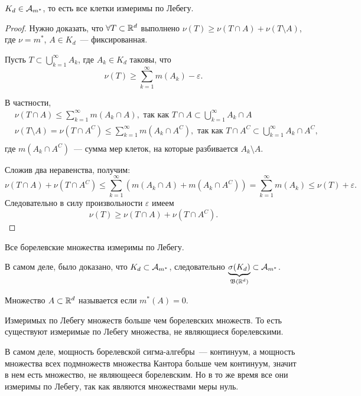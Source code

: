 \begin{claim}
    $K_d\in\mathcal{A}_{m^*}$, то есть все клетки измеримы по Лебегу.

    \begin{proof}
        Нужно доказать, что $\forall T\subset\mathbb{R}^d$ выполнено $\nu(T)\geqslant\nu(T\cap A)+\nu(T\setminus A)$, где
        $\nu=m^*$, $A\in K_d$~--- фиксированная.

        Пусть $T\subset\bigcup\limits_{k=1}^{\infty}A_k$, где $A_k\in K_d$ таковы, что
        \[
            \nu(T)\geqslant \sum_{k=1}^{\infty}m(A_k)-\varepsilon.
        \]

        В частности,
        \begin{align*}
             & \nu(T\cap A)\leqslant \sum_{k=1}^{\infty}m(A_k\cap A), \text{ так как } T\cap A\subset \bigcup_{k=1}^{\infty}A_k\cap A                            \\
             & \nu(T\setminus A)=\nu(T\cap A^C)\leqslant \sum_{k=1}^{\infty}m(A_k\cap A^C), \text{ так как } T\cap A^C\subset \bigcup_{k=1}^{\infty}A_k\cap A^C, \\
        \end{align*}
        где $m(A_k\cap A^C)$~--- сумма мер клеток, на которые разбивается $A_k\setminus A$.

        Сложив два неравенства, получим:
        \[
            \nu(T\cap A)+\nu(T\cap A^C)\leqslant\sum_{k=1}^{\infty}\left(m(A_k\cap A)+m(A_k\cap A^C)\right)=
            \sum_{k=1}^{\infty}m(A_k)\leqslant \nu(T)+\varepsilon.
        \]
        Следовательно в силу произвольности $\varepsilon$ имеем
        \[
            \nu(T)\geqslant\nu(T\cap A)+\nu(T\cap A^C).
        \]

    \end{proof}
\end{claim}

\begin{next0}
    Все борелевские множества измеримы по Лебегу.

    В самом деле, было доказано, что $K_d\subset\mathcal{A}_{m^*}$, следовательно $\underbrace{\sigma(K_d)}_{\mathfrak{B}(\mathbb{R}^d)}\subset \mathcal{A}_{m^*}$.
\end{next0}

\begin{definition}
    Множество $A\subset\mathbb{R}^d$ называется  если $m^*(A)=0$.
\end{definition}

\begin{remark}
    Измеримых по Лебегу множеств больше чем борелевских множеств. То есть существуют измеримые по Лебегу множества, не являющиеся борелевскими.

    В самом деле, мощность борелевской сигма-алгебры~--- континуум, а мощность множества всех подмножеств множества Кантора больше чем континуум,
    значит в нем есть множество, не являющееся борелевским. Но в то же время все они измеримы по Лебегу, так как являются множествами меры нуль.
\end{remark}